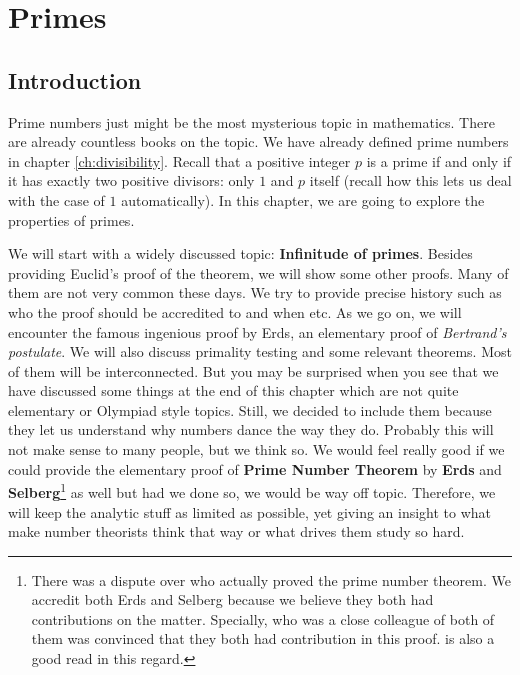 \documentclass{subfiles}
\begin{document}
\chapter{Primes}\label{ch:primes}

\section{Introduction}
	Prime numbers just might be the most mysterious topic in mathematics. There are already countless books on the topic. We have already defined prime numbers in chapter \eqref{ch:divisibility}. Recall that a positive integer $p$ is a prime if and only if it has exactly two positive divisors: only $1$ and $p$ itself (recall how this lets us deal with the case of $1$ automatically). In this chapter, we are going to explore the properties of primes\watermark.

	We will start with a widely discussed topic: \textbf{Infinitude of primes}. Besides providing Euclid's proof of the theorem, we will show some other proofs. Many of them are not very common these days. We try to provide precise history such as who the proof should be accredited to and when etc. As we go on, we will encounter the famous ingenious proof by Erds, an elementary proof of \textit{Bertrand's postulate}. We will also discuss primality testing and some relevant theorems. Most of them will be interconnected. But you may be surprised when you see that we have discussed some things at the end of this chapter which are not quite elementary or Olympiad style topics. Still, we decided to include them because they let us understand why numbers dance the way they do. Probably this will not make sense to many people, but we think so. We would feel really good if we could provide the elementary proof of \textbf{Prime Number Theorem} by \textbf{Erds} and \textbf{Selberg}\footnote{There was a dispute over who actually proved the prime number theorem. We accredit both Erds and Selberg because we believe they both had contributions on the matter. Specially, \textcite{goldfeld_2004} who was a close colleague of both of them was convinced that they both had contribution in this proof. \textcite{baas_skau_2008} is also a good read in this regard.} as well but had we done so, we would be way off topic. Therefore, we will keep the analytic stuff as limited as possible, yet giving an insight to what make number theorists think that way or what drives them study so hard.
\end{document}
